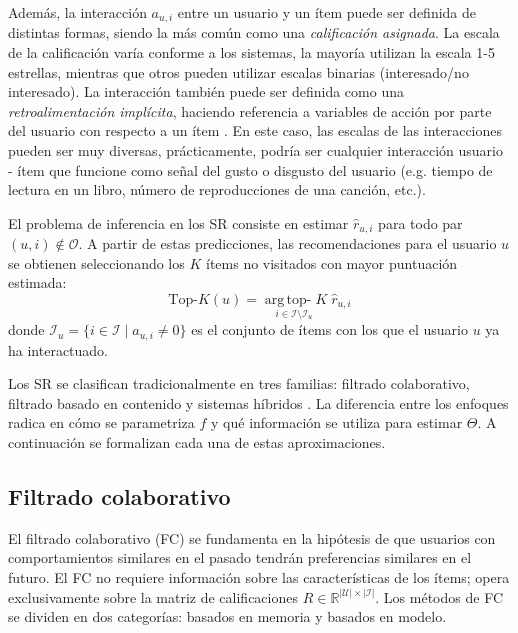 Además, la interacción $a_{u,i}$ entre un usuario y un ítem puede ser definida de distintas formas, siendo la más común como una \textit{calificación asignada}. La escala de la calificación varía conforme a los sistemas, la mayoría utilizan la escala 1-5 estrellas, mientras que otros pueden utilizar escalas binarias (interesado/no interesado). La interacción también puede ser definida como una \textit{retroalimentación implícita}, haciendo referencia a variables de acción por parte del usuario con respecto a un ítem \citep{oard1998implicit}. En este caso, las escalas de las interacciones pueden ser muy diversas, prácticamente, podría ser cualquier interacción usuario - ítem que funcione como señal del gusto o disgusto del usuario (e.g. tiempo de lectura en un libro, número de reproducciones de una canción, etc.).

El problema de inferencia en los SR consiste en estimar $\hat{r}_{u,i}$ para todo par $(u,i) \notin \mathcal{O}$. A partir de estas predicciones, las recomendaciones para el usuario $u$ se obtienen seleccionando los $K$ ítems no visitados con mayor puntuación estimada:
\begin{equation} \label{eq:topk}
	\text{Top-}K(u) = \underset{i \in \mathcal{I} \setminus \mathcal{I}_u}{\operatorname{arg\,top\text{-}}K}\; \hat{r}_{u,i}
\end{equation}
donde $\mathcal{I}_u = \{i \in \mathcal{I} \mid a_{u,i} \neq 0\}$ es el conjunto de ítems con los que el usuario $u$ ya ha interactuado.

Los SR se clasifican tradicionalmente en tres familias: filtrado colaborativo, filtrado basado en contenido y sistemas híbridos \citep{sarkar_tourism_2023}. La diferencia entre los enfoques radica en cómo se parametriza $f$ y qué información se utiliza para estimar $\Theta$. A continuación se formalizan cada una de estas aproximaciones.

\subsection{Filtrado colaborativo} \label{subsec:cf}

El filtrado colaborativo (FC) se fundamenta en la hipótesis de que usuarios con comportamientos similares en el pasado tendrán preferencias similares en el futuro. El FC no requiere información sobre las características de los ítems; opera exclusivamente sobre la matriz de calificaciones $R \in \mathbb{R}^{|\mathcal{U}|\times|\mathcal{I}|}$. Los métodos de FC se dividen en dos categorías: basados en memoria y basados en modelo.

